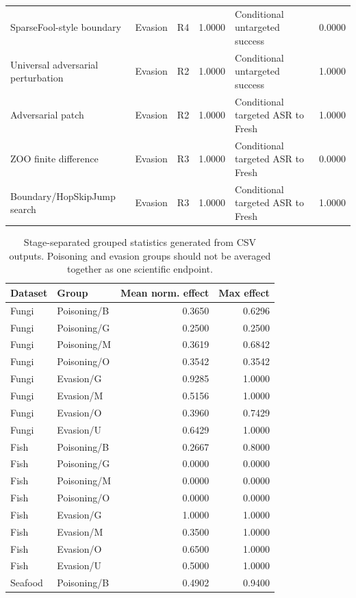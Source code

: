 ﻿\documentclass[6p,10pt,times]{ieeeaccess}
\begin{document}
\begin{table}[t]
\begin{tabular}{p{}p{}p{}p{}p{}p{}}
SparseFool-style boundary & Evasion & R4 & 1.0000 & Conditional untargeted success & 0.0000 \\
Universal adversarial perturbation & Evasion & R2 & 1.0000 & Conditional untargeted success & 1.0000 \\
Adversarial patch & Evasion & R2 & 1.0000 & Conditional targeted ASR to Fresh & 1.0000 \\
ZOO finite difference & Evasion & R3 & 1.0000 & Conditional targeted ASR to Fresh & 0.0000 \\
Boundary/HopSkipJump search & Evasion & R3 & 1.0000 & Conditional targeted ASR to Fresh & 1.0000 \\
\bottomrule
\end{tabular}
\end{table}

\begin{table}[t]
\centering
\caption{Stage-separated grouped statistics generated from CSV outputs. Poisoning and evasion groups should not be averaged together as one scientific endpoint.}
\label{tab:groupstats}
\small
\begin{tabular}{llrr}
\toprule
Dataset & Group & Mean norm. effect & Max effect \\
\midrule
Fungi & Poisoning/B & 0.3650 & 0.6296 \\
Fungi & Poisoning/G & 0.2500 & 0.2500 \\
Fungi & Poisoning/M & 0.3619 & 0.6842 \\
Fungi & Poisoning/O & 0.3542 & 0.3542 \\
Fungi & Evasion/G & 0.9285 & 1.0000 \\
Fungi & Evasion/M & 0.5156 & 1.0000 \\
Fungi & Evasion/O & 0.3960 & 0.7429 \\
Fungi & Evasion/U & 0.6429 & 1.0000 \\
Fish & Poisoning/B & 0.2667 & 0.8000 \\
Fish & Poisoning/G & 0.0000 & 0.0000 \\
Fish & Poisoning/M & 0.0000 & 0.0000 \\
Fish & Poisoning/O & 0.0000 & 0.0000 \\
Fish & Evasion/G & 1.0000 & 1.0000 \\
Fish & Evasion/M & 0.3500 & 1.0000 \\
Fish & Evasion/O & 0.6500 & 1.0000 \\
Fish & Evasion/U & 0.5000 & 1.0000 \\
Seafood & Poisoning/B & 0.4902 & 0.9400 \\

\end{tabular}
\end{table}
\end{document}
